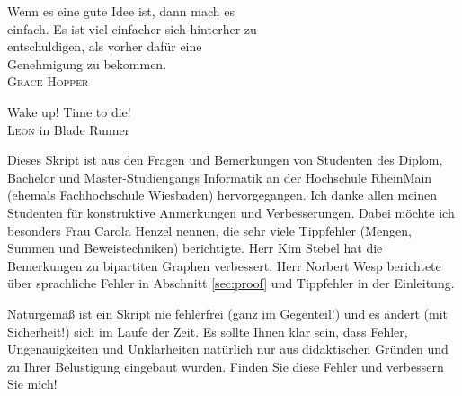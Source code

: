 \documentclass[11pt, a4paper, twoside, bibliography=totoc]{scrartcl}
\begin{document}
\vspace*{1.5cm}

\begin{raggedleft}
Wenn es eine gute Idee ist, dann mach es\\ 
einfach. Es ist viel einfacher sich hinterher zu\\
entschuldigen, als vorher dafür eine\\
Genehmigung zu bekommen.\\[\smallskipamount]
\hfill \textsc{Grace Hopper}%
\end{raggedleft}

\vspace*{1.5cm}

\begin{raggedleft}
Wake up! Time to die!\\[\smallskipamount]
\hfill \textsc{Leon} in Blade Runner%
\end{raggedleft}

\vfill

Dieses Skript ist aus den Fragen und Bemerkungen von Studenten des
Diplom, Bachelor und Master-Studiengangs Informatik an der Hochschule
RheinMain (ehemals Fachhochschule Wiesbaden) hervorgegangen. Ich danke
allen meinen Studenten für konstruktive Anmerkungen und
Verbesserungen. Dabei möchte ich besonders Frau Carola Henzel nennen,
die sehr viele Tippfehler (Mengen, Summen und Beweistechniken)
berichtigte. Herr Kim Stebel hat die Bemerkungen zu bipartiten Graphen
verbessert. Herr Norbert Wesp berichtete über sprachliche Fehler in
Abschnitt \ref{sec:proof} und Tippfehler in der Einleitung. 

Naturgemäß ist ein Skript nie fehlerfrei (ganz im Gegenteil!) und es
ändert (mit Sicherheit!) sich im Laufe der Zeit. Es sollte Ihnen klar 
sein, dass Fehler, Ungenauigkeiten und Unklarheiten natürlich nur 
aus didaktischen Gründen und zu Ihrer  Belustigung eingebaut 
wurden. Finden Sie diese Fehler und verbessern Sie mich!

\cleardoublepage

\tableofcontents

\cleardoublepage

\pagestyle{scrheadings}

	


\end{document}
